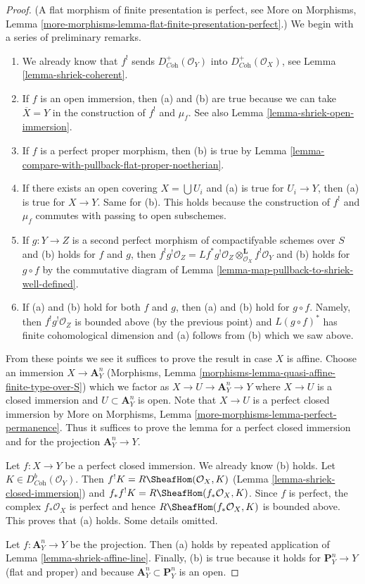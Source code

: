 \begin{proof}
(A flat morphism of finite presentation is perfect, see
More on Morphisms, Lemma
\ref{more-morphisms-lemma-flat-finite-presentation-perfect}.)
We begin with a series of preliminary remarks.
\begin{enumerate}
\item We already know that $f^!$ sends $D_{\textit{Coh}}^+(\mathcal{O}_Y)$
into $D_{\textit{Coh}}^+(\mathcal{O}_X)$, see
Lemma \ref{lemma-shriek-coherent}.
\item If $f$ is an open immersion, then (a) and (b) are true because
we can take $\overline{X} = Y$ in the construction of $f^!$ and $\mu_f$.
See also Lemma \ref{lemma-shriek-open-immersion}.
\item If $f$ is a perfect proper morphism, then (b) is true by
Lemma \ref{lemma-compare-with-pullback-flat-proper-noetherian}.
\item If there exists an open covering $X = \bigcup U_i$ and (a) is
true for $U_i \to Y$, then (a) is true for $X \to Y$. Same for (b).
This holds because the construction of $f^!$ and $\mu_f$ commutes
with passing to open subschemes.
\item If $g : Y \to Z$ is a second perfect morphism of compactifyable
schemes over $S$ and (b) holds for $f$ and $g$, then
$f^!g^!\mathcal{O}_Z =
Lf^*g^!\mathcal{O}_Z \otimes_{\mathcal{O}_X}^\mathbf{L} f^!\mathcal{O}_Y$
and (b) holds for $g \circ f$ by the commutative diagram
of Lemma \ref{lemma-map-pullback-to-shriek-well-defined}.
\item If (a) and (b) hold for both $f$ and $g$, then
(a) and (b) hold for $g \circ f$. Namely, then $f^!g^!\mathcal{O}_Z$
is bounded above (by the previous point) and $L(g \circ f)^*$ has finite
cohomological dimension and (a) follows from (b) which we saw above.
\end{enumerate}
From these points we see it suffices to prove the result in case $X$ is affine.
Choose an immersion $X \to \mathbf{A}^n_Y$
(Morphisms, Lemma \ref{morphisms-lemma-quasi-affine-finite-type-over-S})
which we factor as $X \to U \to \mathbf{A}^n_Y \to Y$ where $X \to U$
is a closed immersion and $U \subset \mathbf{A}^n_Y$ is open.
Note that $X \to U$ is a perfect closed immersion by
More on Morphisms, Lemma \ref{more-morphisms-lemma-perfect-permanence}.
Thus it suffices to prove the lemma for a perfect closed immersion
and for the projection $\mathbf{A}^n_Y \to Y$.

\medskip\noindent
Let $f : X \to Y$ be a perfect closed immersion. We already know (b) holds.
Let $K \in D^b_{\textit{Coh}}(\mathcal{O}_Y)$.
Then $f^!K = R\SheafHom(\mathcal{O}_X, K)$
(Lemma \ref{lemma-shriek-closed-immersion})
and $f_*f^!K = R\SheafHom(f_*\mathcal{O}_X, K)$.
Since $f$ is perfect, the complex $f_*\mathcal{O}_X$ is perfect
and hence $R\SheafHom(f_*\mathcal{O}_X, K)$ is bounded above.
This proves that (a) holds. Some details omitted.

\medskip\noindent
Let $f : \mathbf{A}^n_Y \to Y$ be the projection. Then (a) holds
by repeated application of Lemma \ref{lemma-shriek-affine-line}.
Finally, (b) is true because it holds for $\mathbf{P}^n_Y \to Y$
(flat and proper) and because $\mathbf{A}^n_Y \subset \mathbf{P}^n_Y$
is an open.
\end{proof}

